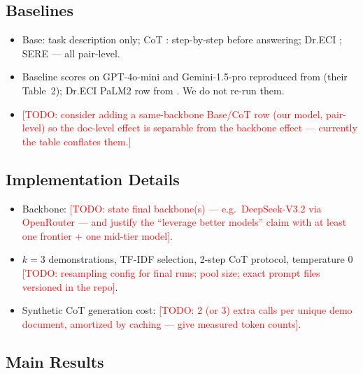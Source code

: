 \documentclass[11pt]{article}
\newcommand{\todo}[1]{\textcolor{red}{[TODO: #1]}}
\begin{document}
\subsection{Baselines}
\begin{itemize}
  \item Base: task description only; CoT \citep{wei2022chain}: step-by-step
        before answering; Dr.ECI \citep{cai2025dreci}; SERE \citep{hao2026sere}
        --- all pair-level.
  \item Baseline scores on GPT-4o-mini and Gemini-1.5-pro reproduced from
        \citet{hao2026sere} (their Table~2); Dr.ECI PaLM2 row from
        \citet{cai2025dreci}. We do not re-run them.
  \item \todo{consider adding a same-backbone Base/CoT row (our model,
        pair-level) so the doc-level effect is separable from the backbone
        effect --- currently the table conflates them.}
\end{itemize}

\subsection{Implementation Details}
\begin{itemize}
  \item Backbone: \todo{state final backbone(s) --- e.g.\ DeepSeek-V3.2 via
        OpenRouter --- and justify the ``leverage better models'' claim with at
        least one frontier + one mid-tier model}.
  \item $k=3$ demonstrations, TF-IDF selection, 2-step CoT protocol,
        temperature 0 \todo{resampling config for final runs; pool size;
        exact prompt files versioned in the repo}.
  \item Synthetic CoT generation cost: \todo{2 (or 3) extra calls per unique
        demo document, amortized by caching --- give measured token counts}.
\end{itemize}

\subsection{Main Results}
\label{sec:results}
\end{document}
